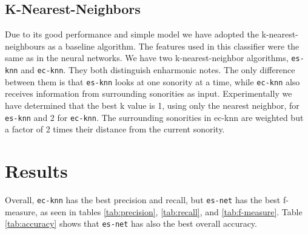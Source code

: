 \documentclass{article}
\newcommand{\comment}[1]{}
\begin{document}
\subsection{K-Nearest-Neighbors}
\label{sec:knn}

\comment{
  ==> baseline (similar a pardo, templates automaticos)
  ==> good theoretical performance (citar \cite{fix.ea:important}) 
  ==> very good practical performance (citar
  \cite{gomez.ea:estimating})
  ==> dizer valor de k, peso do contexto
}

Due to its good performance \cite{fix.ea:important,
  gomez.ea:estimating} and simple model we have adopted the
k-nearest-neighbours as a baseline algorithm. The features used in
this classifier were the same as in the neural networks. We have two
k-nearest-neighbor algorithms, \texttt{es-knn} and
\texttt{ec-knn}. They both distinguish enharmonic notes. The only
difference between them is that \texttt{es-knn} looks at one sonority
at a time, while \texttt{ec-knn} also receives information from
surrounding sonorities as input. Experimentally we have determined
that the best k value is 1, using only the nearest neighbor, for
\texttt{es-knn} and 2 for \texttt{ec-knn}. The surrounding sonorities
in ec-knn are weighted but a factor of 2 times their distance from the
current sonority.

\section{Results}
\label{sec:discussion}

\comment{
  ==> acordes aumentados só são detectados por contexto
  ==> melhor algoritmo em precisão e recall: ec-knn
  ==> melhor algoritmo em accuracy: es-net
  ==> motivo: maior peso pra acordes maiores no total
  ==> contexto não tão important
  ==> enarmonia significativamente importante
  ==> problemas de pardo: precisão e recall baixos de acordes maiores
  e menores, ignorância de notas melódicas
  ==> problemas de ec-net: problemas com acordes menores e notas melódicas
}

Overall, \texttt{ec-knn} has the best precision and recall, but
\texttt{es-net} has the best f-measure, as seen in tables
\ref{tab:precision}, \ref{tab:recall}, and \ref{tab:f-measure}. Table
\ref{tab:accuracy} shows that \texttt{es-net} has also the best
overall accuracy.
\end{document}
